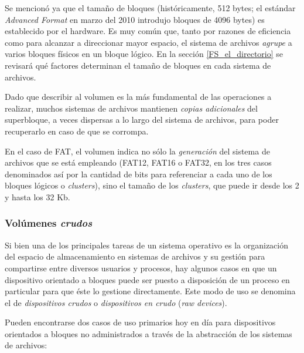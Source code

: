 \documentclass[11pt,fleqn]{book} %
\begin{document}
Se mencionó ya que el tamaño de bloques (históricamente, 512 bytes; el
estándar \emph{Advanced Format} en marzo del 2010 introdujo bloques de 4096
bytes) es establecido por el hardware. Es muy común que, tanto por
razones de eficiencia como para alcanzar a direccionar mayor espacio,
el sistema de archivos \emph{agrupe} a varios bloques físicos en un bloque
lógico. En la sección \ref{FS_el_directorio} se revisará qué factores
determinan el tamaño de bloques en cada sistema de archivos.

Dado que describir al volumen es la más fundamental de las
operaciones a realizar, muchos sistemas de archivos
mantienen \emph{copias adicionales} del superbloque, a veces dispersas a
lo largo del sistema de archivos, para poder recuperarlo en caso de
que se corrompa.

En el caso de FAT, el volumen indica no sólo la \emph{generación} del
sistema de archivos que se está empleando (FAT12, FAT16 o FAT32, en
los tres casos denominados así por la cantidad de bits para
referenciar a cada uno de los bloques lógicos o \emph{clusters}), sino el
tamaño de los \emph{clusters}, que puede ir desde los 2 y hasta los 32 Kb.
\subsubsection{Volúmenes \emph{crudos}}
\label{sec-7-1-3-1}
\label{FS_volumenes_crudos}


Si bien una de los principales tareas de un sistema operativo es
la organización del espacio de almacenamiento en sistemas de
archivos y su gestión para compartirse entre diversos usuarios y
procesos, hay algunos casos en que un dispositivo orientado a bloques
puede ser puesto a disposición de un proceso en particular para que
éste lo gestione directamente. Este modo de uso se denomina el de
\emph{dispositivos crudos} o \emph{dispositivos en crudo} (\emph{raw devices}).

Pueden encontrarse dos casos de uso primarios hoy en día para
dispositivos orientados a bloques no administrados a través de la
abstracción de los sistemas de archivos:
\end{document}
